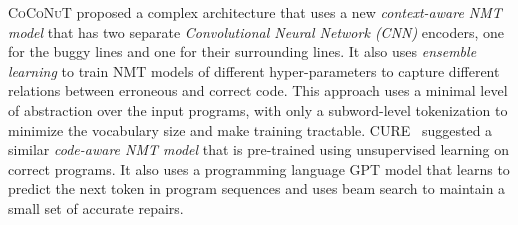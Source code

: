 %
\textsc{CoCoNuT} \citep{Lutellier2020} proposed a complex architecture that uses
a new \emph{context-aware NMT model} that has two separate \emph{Convolutional
Neural Network (CNN)} encoders, one for the buggy lines and one for their
surrounding lines. It also uses \emph{ensemble learning} to train NMT models of
different hyper-parameters to capture different relations between erroneous and
correct code. This approach uses a minimal level of abstraction over the input
programs, with only a subword-level tokenization to minimize the vocabulary size
and make training tractable.
%
\textsc{CURE}~\citep{Jiang_2021} suggested a similar \emph{code-aware NMT model}
that is pre-trained using unsupervised learning on correct programs. It also
uses a programming language \textsc{GPT} \citep{GPT2020} model that learns to
predict the next token in program sequences and uses beam search to maintain a
small set of accurate repairs.
